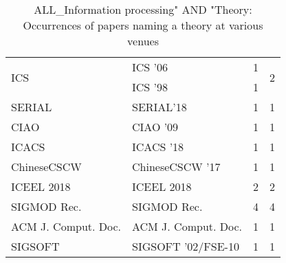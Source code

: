 \begin{table*}[t]
\begin{tabular}{llrr}
\multirow{2}{*}{ICS } & ICS '06 & 1 & \multirow{2}{*}{2}\\
& ICS '98 & 1 &\\
\multirow{1}{*}{SERIAL} & SERIAL'18 & 1 & \multirow{1}{*}{1}\\
\multirow{1}{*}{CIAO } & CIAO '09 & 1 & \multirow{1}{*}{1}\\
\multirow{1}{*}{ICACS } & ICACS '18 & 1 & \multirow{1}{*}{1}\\
\multirow{1}{*}{ChineseCSCW } & ChineseCSCW '17 & 1 & \multirow{1}{*}{1}\\
\multirow{1}{*}{ICEEL 2018} & ICEEL 2018 & 2 & \multirow{1}{*}{2}\\
\multirow{1}{*}{SIGMOD Rec.} & SIGMOD Rec. & 4 & \multirow{1}{*}{4}\\
\multirow{1}{*}{ACM J. Comput. Doc.} & ACM J. Comput. Doc. & 1 & \multirow{1}{*}{1}\\
\multirow{1}{*}{SIGSOFT } & SIGSOFT '02/FSE-10 & 1 & \multirow{1}{*}{1}\\
\end{tabular}
\caption{ALL\_Information processing" AND "Theory: Occurrences of papers naming a theory at various venues}
\end{table*}